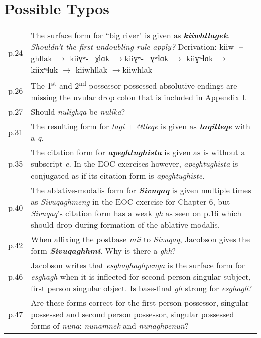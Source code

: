 \documentclass{article}
\begin{document}
\section{Possible Typos}

\begin{tabular}{p{1cm}p{10.5cm}}
p.24 & The surface form for ``big river" is given as \textit{\textbf{kiiwhllagek}. Shouldn't the first undoubling rule apply?} Derivation: kiiw- --ghllak $\rightarrow$ kiiɣʷ- --χɬɑk $\rightarrow$\footnotemark kiiɣʷ- --ɣʷɬɑk $\rightarrow$ kiiɣʷɬɑk $\rightarrow$\footnotemark kiixʷɬɑk $\rightarrow$ kiiwhllak $\rightarrow$\footnotemark kiiwhlak \\

p.26 & The 1\textsuperscript{st} and 2\textsuperscript{nd} possessor possessed absolutive endings are missing the uvular drop colon that is included in Appendix I. \\

p.27 & Should \textit{nulighqa} be \textit{nulika}? \\

p.31 & The resulting form for \textit{tagi} + \textit{@lleqe} is given as \textit{\textbf{taqilleqe}} with a \textit{q}. \\

p.35 & The citation form for \textit{\textbf{apeghtughista}} is given as is without a subscript \textit{e}. In the EOC exercises however, \textit{apeghtughista} is conjugated as if its citation form is \textit{apeghtughiste}. \\

p.40 & The ablative-modalis form for \textit{\textbf{Sivuqaq}} is given multiple times as \textit{Sivuqaghmeng} in the EOC exercise for Chapter 6, but \textit{Sivuqaq}'s citation form has a weak \textit{gh} as seen on p.16 which should drop during formation of the ablative modalis.\\

p.42 & When affixing the postbase \textit{mii} to \textit{Sivuqaq}, Jacobson gives the form \textit{\textbf{Sivuqaghhmi}}.
%
Why is there a \textit{ghh}? \\

p.46 & Jacobson writes that \textit{esghaghaghpenga} is the surface form for \textit{esghagh} when it is inflected for second person singular subject, first person singular object.
%
Is base-final \textit{gh} strong for \textit{esghagh}? \\

p.47 & Are these forms correct for the first person possessor, singular possessed and second person possessor, singular possessed forms of \textit{nuna}: \textit{nunamnek} and \textit{nunaghpenun}? \\


\end{tabular}
\end{document}
